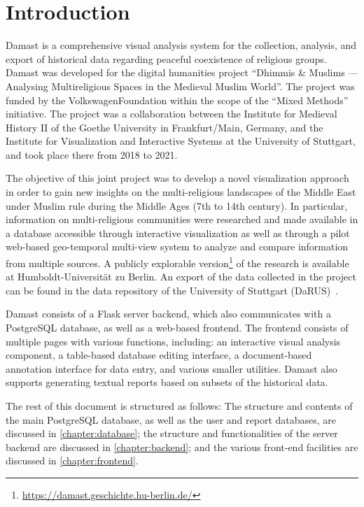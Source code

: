 \chapter{Introduction}
\label{chapter:introduction}

Damast is a comprehensive visual analysis system for the collection, analysis, and export of historical data regarding peaceful coexistence of religious groups.
Damast was developed for the digital humanities project \enquote{Dhimmis \& Muslims --- Analysing Multireligious Spaces in the Medieval Muslim World}.
The project was funded by the VolkswagenFoundation within the scope of the \enquote{Mixed Methods} initiative.
The project was a collaboration between the Institute for Medieval History II of the Goethe University in Frankfurt/Main, Germany, and the Institute for Visualization and Interactive Systems at the University of Stuttgart, and took place there from 2018 to 2021.

The objective of this joint project was to develop a novel visualization approach in order to gain new insights on the multi-religious landscapes of the Middle East under Muslim rule during the Middle Ages (7th to 14th century).
In particular, information on multi-religious communities were researched and made available in a database accessible through interactive visualization as well as through a pilot web-based geo-temporal multi-view system to analyze and compare information from multiple sources.
A publicly explorable version\footnote{\url{https://damast.geschichte.hu-berlin.de/}} of the research is available at Humboldt-Universität zu Berlin.
An export of the data collected in the project can be found in the data repository of the University of Stuttgart (DaRUS)~\cite{darus}.

Damast consists of a Flask server backend, which also communicates with a PostgreSQL database, as well as a web-based frontend.
The frontend consists of multiple pages with various functions, including:
an interactive visual analysis component, a table-based database editing interface, a document-based annotation interface for data entry, and various smaller utilities.
Damast also supports generating textual reports based on subsets of the historical data.

The rest of this document is structured as follows:
The structure and contents of the main PostgreSQL database, as well as the user and report databases, are discussed in \cref{chapter:database};
the structure and functionalities of the server backend are discussed in \cref{chapter:backend}; and
the various front-end facilities are discussed in \cref{chapter:frontend}.
